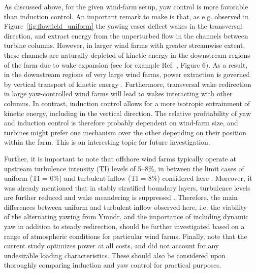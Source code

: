 \documentclass[energies,article,submit,moreauthors,latex,10pt,a4paper]{mdpi}
\begin{document}
As discussed above, for the given wind-farm setup, yaw control is more favorable than induction control.
An important remark to make is that, as e.g. observed in Figure~\ref{fig:flowfield_uniform} the yawing cases deflect wakes in the transversal direction, and extract energy from the unperturbed flow in the channels between turbine columns. However, in larger wind farms with greater streamwise extent, these channels are naturally depleted of kinetic energy in the downstream regions of the farm due to wake expansion (see for example Ref. \cite{allaerts2017boundary}, Figure 6). As a result, in the downstream regions of very large wind farms, power extraction is governed by vertical transport of kinetic energy \cite{cal2010experimental, calaf2010large}. Furthermore, transversal wake redirection in large yaw-controlled wind farms will lead to wakes interacting with other columns. In contrast, induction control allows for a more isotropic entrainment of kinetic energy, including in the vertical direction. The relative profitability of yaw and induction control is therefore probably dependent on wind-farm size, and turbines might prefer one mechanism over the other depending on their position within the farm. This is an interesting topic for future investigation.

Further, it is important to note that offshore wind farms typically operate at upstream turbulence intensity (TI) levels of 5--8\%, in between the limit cases of uniform (TI = 0\%) and turbulent inflow (TI = 8\%) considered here \cite{barthelmie2005ten, barthelmie2009modelling}. Moreover, it was already mentioned that in stably stratified boundary layers, turbulence levels are further reduced and wake meandering is suppressed \cite{larsen2009dependence,machefaux2016experimental}. Therefore, the main differences between uniform and turbulent inflow observed here, i.e. the viability of the alternating yawing from Ymndr, and the importance of including dynamic yaw in addition to steady redirection, should be further investigated based on a range of atmospheric conditions for particular wind farms. Finally, note that the current study optimizes power at all costs, and did not account for any undesirable loading characteristics. These should also be considered upon thoroughly comparing induction and yaw control for practical purposes.
\end{document}
